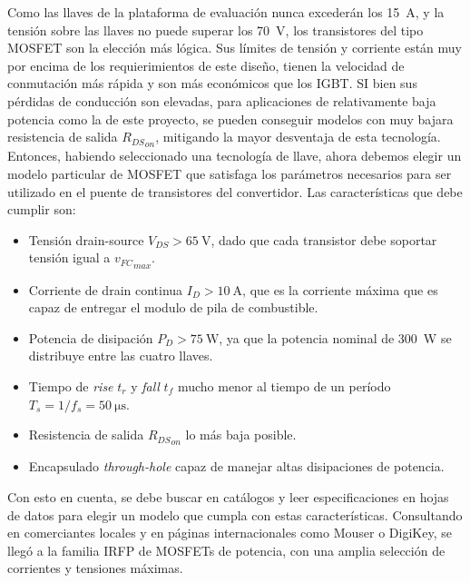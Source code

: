 Como las llaves de la plataforma de evaluación nunca excederán los \SI[]{15}[]{\ampere}, y la tensión sobre las llaves no puede superar los \SI[]{70}[]{\volt}, los transistores del tipo MOSFET son la elección más lógica. Sus límites de tensión y corriente están muy por encima de los requierimientos de este diseño, tienen la velocidad de conmutación más rápida y son más económicos que los IGBT. SI bien sus pérdidas de conducción son elevadas, para aplicaciones de relativamente baja potencia como la de este proyecto, se pueden conseguir modelos con muy bajara resistencia de salida ${R_{DS}}_{on}$, mitigando la mayor desventaja de esta tecnología.\\

Entonces, habiendo seleccionado una tecnología de llave, ahora debemos elegir un modelo particular de MOSFET que satisfaga los parámetros necesarios para ser utilizado en el puente de transistores del convertidor. Las características que debe cumplir son:\\

\begin{itemize}
    \item Tensión drain-source $V_{DS} > \SI[]{65}[]{\volt}$, dado que cada transistor debe soportar tensión igual a ${v_{FC}}_{max}$.
    \item Corriente de drain continua $I_D > \SI[]{10}[]{\ampere}$, que es la corriente máxima que es capaz de entregar el modulo de pila de combustible.
    \item Potencia de disipación $P_D > \SI[]{75}[]{\watt}$, ya que la potencia nominal de \SI[]{300}[]{\watt} se distribuye entre las cuatro llaves.
    \item Tiempo de \textit{rise} $t_r$ y \textit{fall} $t_f$ mucho menor al tiempo de un período $T_s = 1/f_s = \SI[]{50}[]{\micro\second}$.
    \item Resistencia de salida ${R_{DS}}_{on}$ lo más baja posible.
    \item Encapsulado \textit{through-hole} capaz de manejar altas disipaciones de potencia.\\
\end{itemize}

Con esto en cuenta, se debe buscar en catálogos y leer especificaciones en hojas de datos para elegir un modelo que cumpla con estas características. Consultando en comerciantes locales y en páginas internacionales como Mouser o DigiKey, se llegó a la familia IRFP de MOSFETs de potencia, con una amplia selección de corrientes y tensiones máximas.\\

